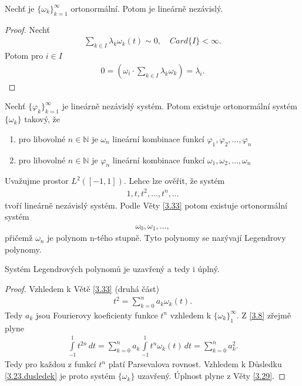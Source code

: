 \begin{tvrz}\label{3.32.tvrz}
Nechť je $\{ \omega_k \}_{k=1}^{\infty}$ ortonormální. Potom je lineárně nezávislý.
\end{tvrz}
\begin{proof}
Nechť
\begin{align*}
\sum \limits _{k \in I} \lambda_k \omega_k(t) \sim 0, \quad Card\{I\} < \infty.
\end{align*}
Potom pro $i \in I$
\begin{align*}
0 = (\omega_i \cdot \sum \limits _{k \in I} \lambda_k \omega_k) = \lambda_i.
\end{align*}
\end{proof}


\begin{theorem}\label{3.33}
Nechť $\{ \varphi_k \}_{k=1}^{\infty}$ je lineárně nezávislý systém. Potom existuje ortonormální systém $\{ \omega_k \}$ takový, že
\begin{enumerate}
\item pro libovolné $n\in \mathbb{N}$ je $\omega_n$ lineární kombinace funkcí $\varphi_1, \varphi_2, \ldots, \varphi_n$
\item pro libovolné $n\in \mathbb{N}$ je $\varphi_n$ lineární kombinace funkcí $\omega_1, \omega_2, \ldots, \omega_n$ 
\end{enumerate}
Uvažujme prostor $L^2([-1,1])$. Lehce lze ověřit, že systém
\begin{align*}
1, t, t^2, \ldots, t^n, \ldots
\end{align*}
tvoří lineárně nezávislý systém. Podle Věty \ref{3.33} potom existuje ortonormální systém
\begin{align*}
\omega_0, \omega_1, \ldots,
\end{align*}
přičemž $\omega_n$ je polynom n-tého stupně. Tyto polynomy se nazývají Legendrovy polynomy.
\end{theorem} 

\begin{theorem}\label{3.34}
Systém Legendrových polynomů je uzavřený a tedy i úplný.
\end{theorem}
\begin{proof}
Vzhledem k Větě \ref{3.33} (druhá část)
\begin{align}\label{3.8}
t^2 = \sum \limits _{k=0}^n a_k \omega_k (t).
\end{align}
Tedy $a_k$ jsou Fourierovy koeficienty funkce $t^n$ vzhledem k $\{ \omega_k \}_1^\infty$. Z \ref{3.8} zřejmě plyne
\begin{align*}
\int \limits_{-1}^1 t^{2n} \, dt = \sum \limits _{k=0}^n a_k \int \limits_{-1}^1 t^n \omega_k (t) \, dt = \sum \limits _{k=0}^n a_k^2.
\end{align*}
Tedy pro každou z funkcí $t^n$ platí Parsevalova rovnost. Vzhledem k Důsledku \ref{3.23.dusledek} je proto systém $\{ \omega_k \}$ uzavřený. Úplnost plyne z Věty \ref{3.29}.
\end{proof}


